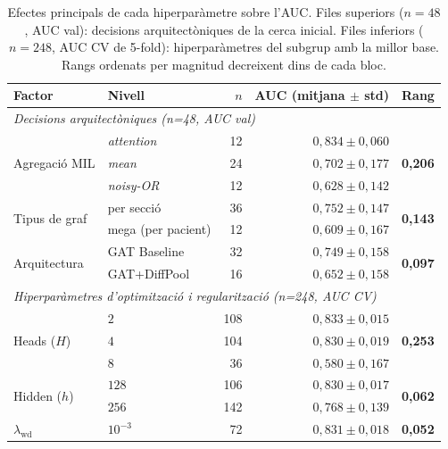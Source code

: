 \documentclass[10pt,a4paper,twocolumn,twoside]{article}
\begin{document}
\begin{table}[H]
\centering
\caption{Efectes principals de cada hiperparàmetre sobre l'AUC. Files superiors ($n\!=\!48$,
AUC val): decisions arquitectòniques de la cerca inicial. Files inferiors ($n\!=\!248$,
AUC CV de 5-fold): hiperparàmetres del subgrup amb la millor base. Rangs ordenats per magnitud
decreixent dins de cada bloc.}
\label{tab:main-effects}
\small
\begin{tabular}{llrrl}
\toprule
\textbf{Factor} & \textbf{Nivell} & \textbf{$n$} & \textbf{AUC (mitjana $\pm$ std)} & \textbf{Rang} \\
\midrule
\multicolumn{5}{l}{\textit{Decisions arquitectòniques (n=48, AUC val)}} \\[2pt]
\multirow{3}{*}{Agregació MIL}
  & \textit{attention}    &  12 & $0{,}834 \pm 0{,}060$ & \multirow{3}{*}{\textbf{0,206}} \\
  & \textit{mean}         &  24 & $0{,}702 \pm 0{,}177$ & \\
  & \textit{noisy-OR}     &  12 & $0{,}628 \pm 0{,}142$ & \\
\midrule
\multirow{2}{*}{Tipus de graf}
  & per secció            &  36 & $0{,}752 \pm 0{,}147$ & \multirow{2}{*}{\textbf{0,143}} \\
  & mega (per pacient)    &  12 & $0{,}609 \pm 0{,}167$ & \\
\midrule
\multirow{2}{*}{Arquitectura}
  & GAT Baseline          &  32 & $0{,}749 \pm 0{,}158$ & \multirow{2}{*}{\textbf{0,097}} \\
  & GAT+DiffPool          &  16 & $0{,}652 \pm 0{,}158$ & \\
\midrule
\multicolumn{5}{l}{\textit{Hiperparàmetres d'optimització i regularització (n=248, AUC CV)}} \\[2pt]
\multirow{3}{*}{Heads ($H$)}
  & $2$                   & 108 & $0{,}833 \pm 0{,}015$ & \multirow{3}{*}{\textbf{0,253}} \\
  & $4$                   & 104 & $0{,}830 \pm 0{,}019$ & \\
  & $8$                   &  36 & $0{,}580 \pm 0{,}167$ & \\
\midrule
\multirow{2}{*}{Hidden ($h$)}
  & $128$                 & 106 & $0{,}830 \pm 0{,}017$ & \multirow{2}{*}{\textbf{0,062}} \\
  & $256$                 & 142 & $0{,}768 \pm 0{,}139$ & \\
\midrule
\multirow{3}{*}{$\lambda_{\text{wd}}$}
  & $10^{-3}$             &  72 & $0{,}831 \pm 0{,}018$ & \multirow{3}{*}{\textbf{0,052}} \\

\end{tabular}
\end{table}
\end{document}

